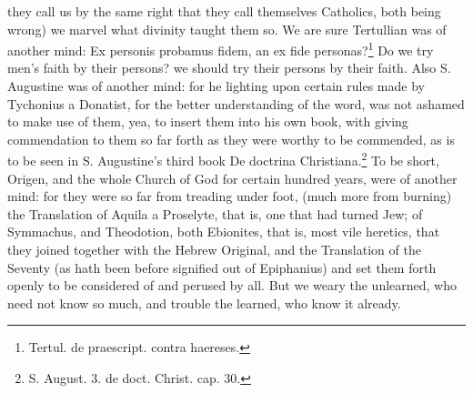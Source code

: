 they call us by the same right that they call themselves Catholics, both being wrong) we marvel what divinity taught them so. We are sure Tertullian was of another mind: Ex personis probamus fidem, an ex fide personas?\footnote{Tertul. de praescript. contra haereses.} Do we try men's faith by their persons? we should try their persons by their faith. Also S. Augustine was of another mind: for he lighting upon certain rules made by Tychonius a Donatist, for the better understanding of the word, was not ashamed to make use of them, yea, to insert them into his own book, with giving commendation to them so far forth as they were worthy to be commended, as is to be seen in S. Augustine's third book De doctrina Christiana.\footnote{S. August. 3. de doct. Christ. cap. 30.} To be short, Origen, and the whole Church of God for certain hundred years, were of another mind: for they were so far from treading under foot, (much more from burning) the Translation of Aquila a Proselyte, that is, one that had turned Jew; of Symmachus, and Theodotion, both Ebionites, that is, most vile heretics, that they joined together with the Hebrew Original, and the Translation of the Seventy (as hath been before signified out of Epiphanius) and set them forth openly to be considered of and perused by all. But we weary the unlearned, who need not know so much, and trouble the learned, who know it already.

